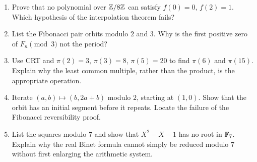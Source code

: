 \begin{exercisebox}
\begin{enumerate}
  \item Prove that no polynomial over $\mathbb Z/8\mathbb Z$ can satisfy
  $f(0)=0$, $f(2)=1$. Which hypothesis of the interpolation theorem
  fails? 
  \item List the Fibonacci pair orbits modulo $2$ and $3$. Why is the
  first positive zero of $F_n\pmod3$ not the period? 
  \item Use CRT and $\pi(2)=3$, $\pi(3)=8$, $\pi(5)=20$ to find
  $\pi(6)$ and $\pi(15)$. Explain why the least common multiple,
  rather than the product, is the appropriate operation.
  \item Iterate $(a,b)\mapsto(b,2a+b)$ modulo $2$, starting at $(1,0)$.
  Show that the orbit has an initial segment before it repeats.
  Locate the failure of the Fibonacci reversibility proof.
  \item List the squares modulo $7$ and show that $X^2-X-1$ has no
  root in $\mathbb F_7$. Explain why the real Binet formula cannot simply
  be reduced modulo $7$ without first enlarging the arithmetic system.
\end{enumerate}
\end{exercisebox}

